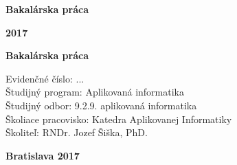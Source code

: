 \begin{center}
\centerline{\LARGE\sc\textbf\skola}
\sc\LARGE\textbf\fakulta
\end{center}

\vspace*{8cm}

\begin{center}
\begin{minipage}{0.8\textwidth}
\begin{center}
 \LARGE\sc\textbf\nazov
 \vspace{1em}
 \centerline{\Large\bf Bakalárska práca}
\end{center}
\end{minipage}
\end{center}

\vfill
\noindent
 {\bf 2017}  \hfill {\bf \autor}
\thispagestyle{empty}



\newpage
\begin{center}
\centerline{\LARGE\sc\textbf\skola}
\sc\LARGE\textbf\fakulta
\end{center}

\vspace*{8cm}

\begin{center}
\begin{minipage}{0.8\textwidth}
\begin{center}
 \LARGE\sc\textbf\nazov 
\end{center}
\vspace{1em}
\centerline{\Large\bf Bakalárska práca}
\end{minipage}
\end{center}

\vspace{5cm}

\selectfont

\noindent
Evidenčné číslo: \hspace{1.7em}...\\
Študijný program: \hspace{0.8em} Aplikovaná informatika\\
Študijný odbor:  \hspace{1.85em} 9.2.9. aplikovaná informatika\\
Školiace pracovisko: Katedra Aplikovanej Informatiky\\
Školiteľ:  \hspace{4.6em} RNDr. Jozef Šiška, PhD.


\vfill
\noindent
{\bf Bratislava 2017}  \hfill {\bf \autor}
\thispagestyle{empty}

\newpage

